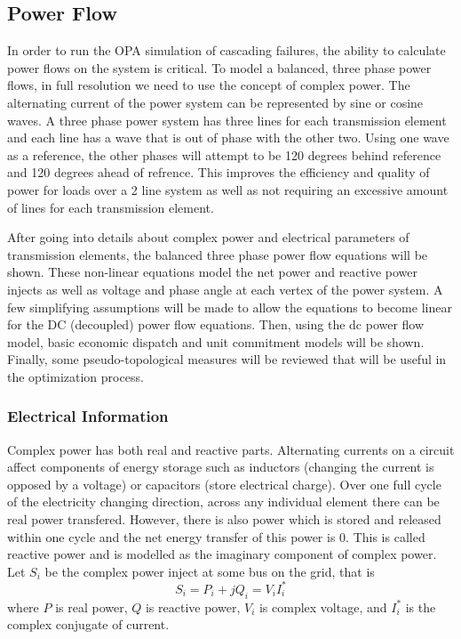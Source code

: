 \subsection{Power Flow}
In order to run the OPA simulation of cascading failures, the ability to calculate power flows on the system is critical.  To model a balanced, three phase power flows, in full resolution we need to use the concept of complex power.  The alternating current of the power system can be represented by sine or cosine waves.  A three phase power system has three lines for each transmission element and each line has a wave that is out of phase with the other two.  Using one wave as a reference, the other phases will attempt to be 120 degrees behind reference and 120 degrees ahead of refrence.  This improves the efficiency and quality of power for loads over a 2 line system as well as not requiring an excessive amount of lines for each transmission element.  

After going into details about complex power and electrical parameters of transmission elements, the balanced three phase power flow equations will be shown.  These non-linear equations model the net power and reactive power injects as well as voltage and phase angle at each vertex of the power system.  A few simplifying assumptions will be made to allow the equations to become linear for the DC (decoupled) power flow equations.  Then, using the dc power flow model, basic economic dispatch and unit commitment models will be shown.  Finally, some pseudo-topological measures will be reviewed that will be useful in the optimization process.

\subsubsection{Electrical Information}
Complex power has both real and reactive parts.  Alternating currents  on a circuit affect components of energy storage such as inductors (changing the current is opposed by a voltage)  or capacitors (store electrical charge).  Over one full cycle of the electricity changing direction, across any individual element there can be real power transfered.  However, there is also power which is stored and released within one cycle and the net energy transfer of this power is 0.  This is called reactive power and is modelled as the imaginary component of complex power.  Let $S_i$ be the complex power inject at some bus on the grid, that is
\begin{equation}
S_i = P_i + j Q_i = V_i I_i^*
\end{equation}
where $P$ is real power, $Q$ is reactive power, $V_i$ is complex voltage, and $I_i^*$ is the complex conjugate of current.  
	
